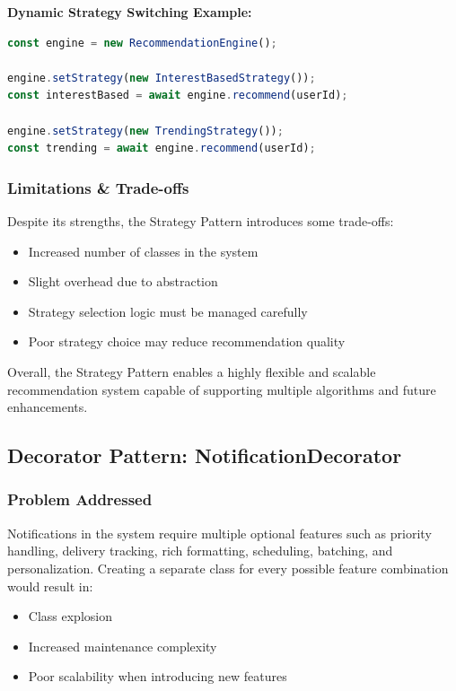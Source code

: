\documentclass[a4paper,12pt]{report}
\begin{document}
\textbf{Dynamic Strategy Switching Example:}
\begin{lstlisting}[language=JavaScript, numbers=none]
const engine = new RecommendationEngine();

engine.setStrategy(new InterestBasedStrategy());
const interestBased = await engine.recommend(userId);

engine.setStrategy(new TrendingStrategy());
const trending = await engine.recommend(userId);
\end{lstlisting}

\subsubsection{Limitations \& Trade-offs}
Despite its strengths, the Strategy Pattern introduces some trade-offs:
\begin{itemize}
    \item Increased number of classes in the system
    \item Slight overhead due to abstraction
    \item Strategy selection logic must be managed carefully
    \item Poor strategy choice may reduce recommendation quality
\end{itemize}

Overall, the Strategy Pattern enables a highly flexible and scalable recommendation system capable of supporting multiple algorithms and future enhancements.


\subsection{Decorator Pattern: NotificationDecorator}

\subsubsection{Problem Addressed}
Notifications in the system require multiple optional features such as priority handling, delivery tracking, rich formatting, scheduling, batching, and personalization.  
Creating a separate class for every possible feature combination would result in:
\begin{itemize}
    \item Class explosion
    \item Increased maintenance complexity
    \item Poor scalability when introducing new features
\end{itemize}
\end{document}
